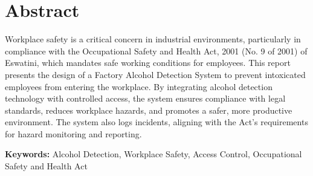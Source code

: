 \section*{Abstract}
Workplace safety is a critical concern in industrial environments, particularly in compliance with the Occupational Safety and Health Act, 2001 (No. 9 of 2001) of Eswatini, which mandates safe working conditions for employees. This report presents the design of a Factory Alcohol Detection System to prevent intoxicated employees from entering the workplace. By integrating alcohol detection technology with controlled access, the system ensures compliance with legal standards, reduces workplace hazards, and promotes a safer, more productive environment. The system also logs incidents, aligning with the Act's requirements for hazard monitoring and reporting.

\vspace{.5cm}

\textbf{Keywords:} Alcohol Detection, Workplace Safety, Access Control, Occupational Safety and Health Act
\newpage